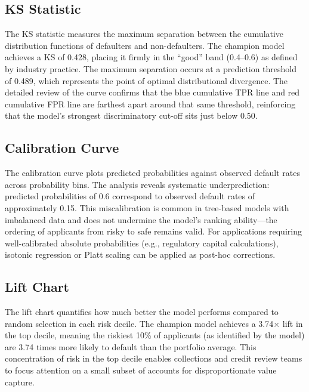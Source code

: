 \subsection{KS Statistic}

The \ac{KS} statistic measures the maximum separation between the cumulative distribution functions of defaulters and non-defaulters. The champion model achieves a \ac{KS} of 0.428, placing it firmly in the ``good'' band (0.4--0.6) as defined by industry practice. The maximum separation occurs at a prediction threshold of 0.489, which represents the point of optimal distributional divergence. The detailed review of the curve confirms that the blue cumulative \ac{TPR} line and red cumulative \ac{FPR} line are farthest apart around that same threshold, reinforcing that the model's strongest discriminatory cut-off sits just below 0.50.

\subsection{Calibration Curve}

The calibration curve plots predicted probabilities against observed default rates across probability bins. The analysis reveals systematic underprediction: predicted probabilities of 0.6 correspond to observed default rates of approximately 0.15. This miscalibration is common in tree-based models with imbalanced data and does not undermine the model's ranking ability---the ordering of applicants from risky to safe remains valid. For applications requiring well-calibrated absolute probabilities (e.g., regulatory capital calculations), isotonic regression or Platt scaling can be applied as post-hoc corrections.

\subsection{Lift Chart}

The lift chart quantifies how much better the model performs compared to random selection in each risk decile. The champion model achieves a 3.74$\times$ lift in the top decile, meaning the riskiest 10\% of applicants (as identified by the model) are 3.74 times more likely to default than the portfolio average. This concentration of risk in the top decile enables collections and credit review teams to focus attention on a small subset of accounts for disproportionate value capture.


